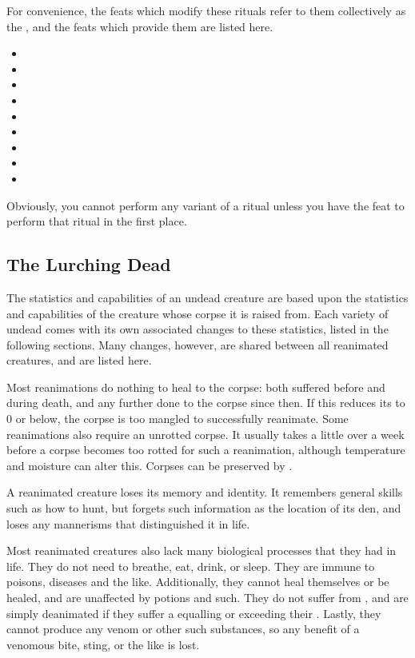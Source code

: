 For convenience, the feats which modify these rituals refer to them collectively as the {\reanimationrituals}, and the feats which provide them are listed here.
\begin{itemize}
	\item {}
	\item {}
	\item {}
	\item {}
	\item {}
	\item {}
	\item {}
	\item {}
	\item {}
\end{itemize}
Obviously, you cannot perform any variant of a ritual unless you have the feat to perform that ritual in the first place.

\subsection{The Lurching Dead}

The statistics and capabilities of an undead creature are based upon the statistics and capabilities of the creature whose corpse it is raised from.
Each variety of undead comes with its own associated changes to these statistics, listed in the following sections.
Many changes, however, are shared between all reanimated creatures, and are listed here.

Most reanimations do nothing to heal {\damage} to the corpse: both {\damage} suffered before and during death, and any further {\damage} done to the corpse since then.
If this reduces its  to 0 or below, the corpse is too mangled to successfully reanimate.
Some reanimations also require an unrotted corpse.
It usually takes a little over a week before a corpse becomes too rotted for such a reanimation, although temperature and moisture can alter this.
Corpses can be preserved by {\embalming}.

A reanimated creature loses its memory and identity.
It remembers general skills such as how to hunt, but forgets such information as the location of its den, and loses any mannerisms that distinguished it in life.

Most reanimated creatures also lack many biological processes that they had in life.
They do not need to breathe, eat, drink, or sleep.
They are immune to poisons, diseases and the like.
Additionally, they cannot heal themselves or be healed, and are unaffected by potions and such.
They do not suffer from {\shock}, and are simply deanimated if they suffer a {\damagetest} equalling or exceeding their .
Lastly, they cannot produce any venom or other such substances, so any benefit of a venomous bite, sting, or the like is lost.

